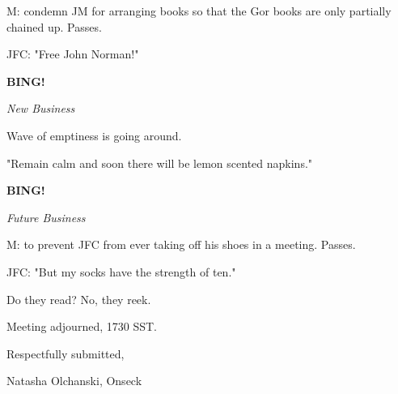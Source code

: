\documentclass[12pt]{article}
\newcommand{\bing}{{\bf BING!} }
\newcommand{\goto}[1]{\bing \vskip 12pt \centerline{{\em{#1}}}}
\begin{document}
M: condemn JM for arranging books so that the Gor books are only partially chained up. Passes.

JFC: "Free John Norman!"

\goto{New Business}

Wave of emptiness is going around.

"Remain calm and soon there will be lemon scented napkins."

\goto{Future Business}

M: to prevent JFC from ever taking off his shoes in a meeting. Passes.

JFC: "But my socks have the strength of ten."

Do they read? No, they reek.

\vspace{12pt}

\noindent
Meeting adjourned, 1730 SST.

\vspace{18pt}

\centerline{Respectfully submitted,}
\centerline{Natasha Olchanski, Onseck}
\end{document}
